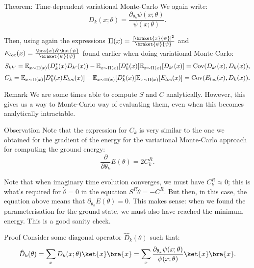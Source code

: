 \documentclass[a4paper]{article}
\begin{document}
\begin{parag}{Theorem: Time-dependent variational Monte-Carlo}
    We again write: 
    \[D_k\left(x; \theta\right) = \frac{\partial_{\theta_k}\psi\left(x; \theta\right)}{\psi\left(x; \theta\right)}.\]

    Then, using again the expressions $\Pi\left(x\right) = \frac{\left|\braket{x}{\psi}\right|^2}{\braket{\psi}{\psi}}$ and $E_{loc}\left(x\right) = \frac{\bra{x} \hat{H} \ket{\psi}}{\braket{\psi}{\psi}}$ found earlier when doing variational Monte-Carlo: 
    \[S_{k k'} = \exval_{x \followsdistr \Pi\left(x\right)}\left(D_k^*\left(x\right) D_{k'}\left(x\right)\right) - \exval_{x \followsdistr \Pi\left(x\right)}\left[D_k^*\left(x\right)\right] \exval_{x \followsdistr \Pi\left(x\right)}\left[D_{k'}\left(x\right)\right] = \Cov\left(D_{k'}\left(x\right), D_k\left(x\right)\right),\]
    \[C_k = \exval_{x \followsdistr \Pi\left(x\right)}\left[D_k^*\left(x\right) E_{loc}\left(x\right)\right] - \exval_{x \followsdistr \Pi\left(x\right)}\left[D_k^*\left(x\right)\right] \exval_{x \followsdistr \Pi\left(x\right)}\left[E_{loc}\left(x\right)\right] = \Cov\left(E_{loc}\left(x\right), D_k\left(x\right)\right).\]

    \begin{subparag}{Remark}
        We are some times able to compute $S$ and $C$ analytically. However, this gives us a way to Monte-Carlo way of evaluating them, even when this becomes analytically intractable.
    \end{subparag}

    \begin{subparag}{Observation}
        Note that the expression for $C_k$ is very similar to the one we obtained for the gradient of the energy for the variational Monte-Carlo approach for computing the ground energy:
        \[\frac{\partial}{\partial \theta_k} E\left(\theta\right) = 2 C_k^R.\]

        Note that when imaginary time evolution converges, we must have $C_k^R \approx 0$; this is what's required for $\dot{\theta} = 0$ in the equation $S^R \dot{\theta} = -C^R$. But then, in this case, the equation above means that $\partial_{\theta_k} E\left(\theta\right) = 0$. This makes sense: when we found the parameterisation for the ground state, we must also have reached the minimum energy. This is a good sanity check.
    \end{subparag}
    
    \begin{subparag}{Proof}
        Consider some diagonal operator $\hat{D}_k\left(\theta\right)$ such that: 
        \[\hat{D}_k\left(\theta\right) = \sum_{x} D_k\left(x; \theta\right) \ket{x}\bra{x} = \sum_{x} \frac{\partial_{\theta_k} \psi\left(x; \theta\right)}{\psi\left(x; \theta\right)} \ket{x}\bra{x}.\]
        

\end{subparag}
\end{parag}
\end{document}
